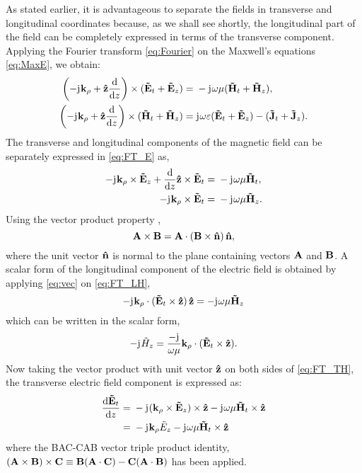 \documentclass[12pt]{article}
\begin{document}
As stated earlier, it is advantageous to separate the fields in transverse and longitudinal coordinates because, as we shall see shortly, the longitudinal part of the field can be completely expressed in terms of the transverse component. Applying the Fourier transform \eqref{eq:Fourier} on the Maxwell's equations \eqref{eq:MaxE}, we obtain:
%
\begin{subequations}
\begin{align}
\left(-\mathrm{j}\mkern1mu \mathbf{k}_{\rho} + \mathbf{\hat{z}} \dv{}{z} \right)\times (\mathbf{\tilde{E}}_t + \mathbf{\tilde{E}}_z)  ={}& -\mathrm{j}\mkern1mu \omega \mu (\mathbf{\tilde{H}}_t + \mathbf{\tilde{H}}_z),
\label{eq:FT_E}\\
\left(-\mathrm{j}\mkern1mu \mathbf{k}_{\rho} + \mathbf{\hat{z}} \dv{}{z} \right)\times (\mathbf{\tilde{H}}_t + \mathbf{\tilde{H}}_z)  ={}& \mathrm{j}\mkern1mu \omega \varepsilon (\mathbf{\tilde{E}}_t + \mathbf{\tilde{E}}_z) -
(\mathbf{\tilde{J}}_t + \mathbf{\tilde{J}}_z).
\label{eq:FT_H}
\end{align}
\label{eq:FT_EH}%
\end{subequations}
%
The transverse and longitudinal components of the magnetic field can be separately expressed in \eqref{eq:FT_E} as,
%
\begin{subequations}
\begin{align}
-\mathrm{j}\mkern1mu \mathbf{k}_{\rho} \times \mathbf{\tilde{E}}_z +
\dv{}{z}\mathbf{\hat{z}} \times \mathbf{\tilde{E}}_t ={}&
-\mathrm{j}\mkern1mu \omega \mu \mathbf{\tilde{H}}_t,
\label{eq:FT_TH}\\
-\mathrm{j}\mkern1mu \mathbf{k}_{\rho} \times \mathbf{\tilde{E}}_t ={}&
-\mathrm{j}\mkern1mu \omega \mu \mathbf{\tilde{H}}_z.
\label{eq:FT_LH}
\end{align}
\label{eq:FT_TLH}%
\end{subequations}
%
Using the vector product property \cite[p. 117]{fang2010},
%
\begin{equation}
\mathbf{A} \times \mathbf{B} =\mathbf{A} \cdot (\mathbf{B} \times \mathbf{\hat{n}}) \, \mathbf{\hat{n}},
\label{eq:vec}
\end{equation}
%
where the unit vector $\mathbf{\hat{n}}$ is normal to the plane containing vectors $\mathbf{A}$ and $\mathbf{B}$. A scalar form of the longitudinal component of the electric field is obtained by applying \eqref{eq:vec} on \eqref{eq:FT_LH},
%
\begin{equation}
- \mathrm{j}\mkern1mu \mathbf{k}_{\rho} \cdot (\mathbf{\tilde{E}}_t \times \mathbf{\hat{z}}) \, \mathbf{\hat{z}} =
- \mathrm{j}\mkern1mu \omega \mu \mathbf{\tilde{H}}_z
\label{eq:FT_LH}
\end{equation}
%
which can be written in the scalar form,
%
\begin{equation}
- \mathrm{j}\mkern1mu \tilde{H}_z = \frac{- \mathrm{j}\mkern1mu}{\omega \mu}
\mathbf{k}_{\rho} \cdot (\mathbf{\tilde{E}}_t \times \mathbf{\hat{z}}).
\label{eq:sLH}
\end{equation}
%
Now taking the vector product with unit vector $\mathbf{\hat{z}}$ on both sides of \eqref{eq:FT_TH}, the transverse electric field component is expressed as:
%
\begin{equation}
\begin{split}
\dv{\v{\ti{E}}_t}{z} ={}& -\j (\v{k}_{\p} \x \v{\ti{E}}_z) \x \v{\^{z}}
-\j \O \u \v{\ti{H}}_t \x \v{\^{z}}\\
={}& -\j \v{k}_{\p} \ti{{E}}_z -\j \O \u \v{\ti{H}}_t \x \v{\^{z}}
\end{split}
\label{eq:dFT_ET}%
\end{equation}
%
where the BAC-CAB vector triple product identity, $(\mathbf{A} \times \mathbf{B})\times\mathbf{C} \equiv \mathbf{B}(\mathbf{A} \cdot \mathbf{C}) - \mathbf{C}(\mathbf{A} \cdot \mathbf{B})$ has been applied.
\end{document}

